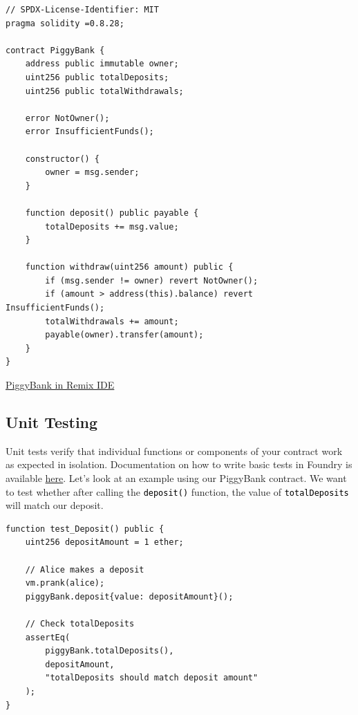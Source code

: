 \documentclass[12pt]{article}
\newcommand{\codegrey}[1]{%
  \texttt{\colorbox{black!4}{\textcolor{black}{#1}}}%
}
\begin{document}
\noindent \begin{minipage}{\textwidth}
    \begin{lstlisting}[language=Solidity]
// SPDX-License-Identifier: MIT
pragma solidity =0.8.28;

contract PiggyBank {
    address public immutable owner;
    uint256 public totalDeposits;
    uint256 public totalWithdrawals;
    
    error NotOwner();
    error InsufficientFunds();
    
    constructor() {
        owner = msg.sender;
    }
    
    function deposit() public payable {
        totalDeposits += msg.value;
    }
  
    function withdraw(uint256 amount) public {
        if (msg.sender != owner) revert NotOwner();
        if (amount > address(this).balance) revert InsufficientFunds();
        totalWithdrawals += amount;
        payable(owner).transfer(amount);
    }
}
\end{lstlisting}
\end{minipage}

\medskip
\noindent
\href{https://remix.ethereum.org/?#activate=solidity&url=https://github.com/radovluk/unbreakable-vault/contracts/PiggyBank.sol&lang=en&optimize=false&runs=200&evmVersion=null&version=soljson-v0.8.28+commit.7893614a.js}{PiggyBank in Remix IDE}

\subsection{Unit Testing}

Unit tests verify that individual functions or components of your contract work
as expected in isolation. Documentation on how to write basic tests in Foundry
is available \href{https://book.getfoundry.sh/forge/writing-tests}{here}. Let's
look at an example using our PiggyBank contract. We want to test whether after
calling the \codegrey{deposit()} function, the value of
\codegrey{totalDeposits} will match our deposit.

\noindent \begin{minipage}{\textwidth}
    \begin{lstlisting}[language=Solidity]
function test_Deposit() public {
    uint256 depositAmount = 1 ether;
    
    // Alice makes a deposit
    vm.prank(alice);
    piggyBank.deposit{value: depositAmount}();
    
    // Check totalDeposits
    assertEq(
        piggyBank.totalDeposits(),
        depositAmount,
        "totalDeposits should match deposit amount"
    );
}
\end{lstlisting}
\end{minipage}
\end{document}
